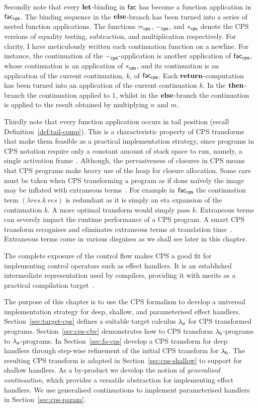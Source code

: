 \documentclass[12pt,phd,lfcs,twoside,openright,logo,leftchapter,normalheadings]{infthesis}
\theoremstyle{plain}
\theoremstyle{definition}
\begin{document}
Secondly note that every $\mathbf{let}$-binding in $\mathsf{fac}$ has become a
function application in $\mathsf{fac}_{\mathsf{cps}}$. The binding sequence
in the $\mathbf{else}$-branch has been turned into a series of nested function
applications. The functions $=_{\mathsf{cps}}$, $-_{\mathsf{cps}}$, and
$*_{\mathsf{cps}}$ denote the CPS versions of equality testing,
subtraction, and multiplication respectively.
%
For clarity, I have meticulously written each continuation function on
a newline. For instance, the continuation of the
$-_{\mathsf{cps}}$-application is another application of
$\mathsf{fac}_{\mathsf{cps}}$, whose continuation is an application of
$*_{\mathsf{cps}}$, and its continuation is an application of the current
continuation, $k$, of $\mathsf{fac}_{\mathsf{cps}}$.
%
Each $\mathbf{return}$-computation has been turned into an application of the
current continuation $k$. In the $\mathbf{then}$-branch the continuation
applied to $1$, whilst in the $\mathbf{else}$-branch the continuation is
applied to the result obtained by multiplying $n$ and $m$.

%
Thirdly note that every function application occurs in tail position
(recall Definition~\ref{def:tail-comp}). This is a characteristic
property of CPS transforms that make them feasible as a practical
implementation strategy, since programs in CPS notation require only a
constant amount of stack space to run, namely, a single activation
frame~\cite{Appel92}. Although, the pervasiveness of closures in CPS
means that CPS programs make heavy use of the heap for closure
allocation.
%
Some care must be taken when CPS transforming a program as if done
naïvely the image may be inflated with extraneous
terms~\cite{DanvyN05}. For example in $\mathsf{fac}_{\mathsf{cps}}$ the
continuation term $(\lambda res.k~res)$ is redundant as it is simply
an eta expansion of the continuation $k$. A more optimal transform
would simply pass $k$. Extraneous terms can severely impact the
runtime performance of a CPS program. A smart CPS transform recognises
and eliminates extraneous terms at translation
time~\cite{DanvyN03}. Extraneous terms come in various disguises as we
shall see later in this chapter.

The complete exposure of the control flow makes CPS a good fit for
implementing control operators such as effect handlers. It is an
established intermediate representation used by compilers, providing
it with merits as a practical compilation
target~\cite{Appel92,Kennedy07}.

The purpose of this chapter is to use the CPS formalism to develop a
universal implementation strategy for deep, shallow, and parameterised
effect handlers. Section~\ref{sec:target-cps} defines a suitable
target calculus $\lambda_{\mathsf{u}}$ for CPS transformed
programs. Section~\ref{sec:cps-cbv} demonstrates how to CPS transform
$\lambda_{\mathsf{b}}$-programs to $\lambda_{\mathsf{u}}$-programs. In Section~\ref{sec:fo-cps}
develop a CPS transform for deep handlers through step-wise refinement
of the initial CPS transform for $\lambda_{\mathsf{b}}$. The resulting CPS transform
is adapted in Section~\ref{sec:cps-shallow} to support for shallow
handlers. As a by-product we develop the notion of \emph{generalised
  continuation}, which provides a versatile abstraction for
implementing effect handlers. We use generalised continuations to
implement parameterised handlers in Section~\ref{sec:cps-param}.
%
\end{document}
